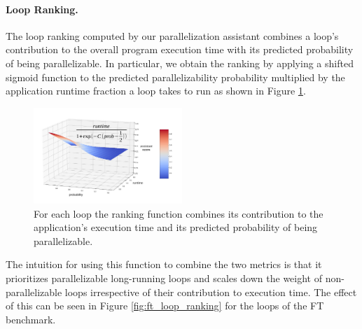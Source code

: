 \paragraph{Loop Ranking.}
The loop ranking computed by our parallelization assistant combines a loop's contribution to the overall program execution time with its predicted probability of being parallelizable. In particular, we obtain the ranking by applying a shifted sigmoid function to the predicted parallelizability probability multiplied by the application runtime fraction a loop takes to run as shown in Figure \ref{fig:sigmoid_3d}.
\begin{figure}[ht]
\includegraphics[width=0.5\textwidth]{images/product_func.pdf}
\caption{For each loop the ranking function combines its contribution to the application's execution time and its predicted probability of being parallelizable.}
\label{fig:sigmoid_3d}
\end{figure}

The intuition for using this function to combine the two metrics is that it prioritizes parallelizable long-running loops and scales down the weight of non-parallelizable loops irrespective of their contribution to execution time. The effect of this can be seen in Figure \ref{fig:ft_loop_ranking} for the loops of the FT benchmark.


